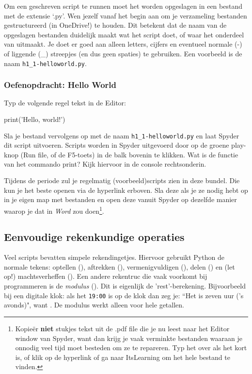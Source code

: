 \documentclass[a4paper,11pt, fleqn]{article}
\begin{document}
Om een geschreven script te runnen moet het worden opgeslagen in een bestand met de extensie `.py'. Wen jezelf vanaf het begin aan om je verzameling bestanden gestructureerd (in OneDrive!) te houden. Dit betekent dat de naam van de opgeslagen bestanden duidelijk maakt wat het script doet, of waar het onderdeel van uitmaakt. Je doet er goed aan alleen letters, cijfers en eventueel normale (-) of liggende (\_) streepjes (en dus geen spaties) te gebruiken. Een voorbeeld is de naam \verb,h1_1-helloworld.py,.

\subsubsection*{Oefenopdracht: Hello World} 
Typ de volgende regel tekst in de Editor: 
\begin{python}
print('Hello, world!')
\end{python}
Sla je bestand vervolgens op met de naam \verb,h1_1-helloworld.py, en laat Spyder dit script uitvoeren. 
Scripts worden in Spyder uitgevoerd door op de groene play-knop (Run file, of de F5-toets) in de balk bovenin te klikken.
Wat is de functie van het commando print? Kijk hiervoor in de console rechtsonderin.

Tijdens de periode zul je regelmatig (voorbeeld)scripts zien in deze bundel. Die kun je het beste openen via de hyperlink erboven. 
Sla deze als je ze nodig hebt op in je eigen map met bestanden en open deze vanuit Spyder op dezelfde manier waarop je dat in \textit{Word} zou doen\footnote{Kopie\"{e}r \textbf{niet} stukjes tekst uit de .pdf file die je nu leest naar het Editor window van Spyder, want dan krijg je vaak verminkte bestanden waaraan je onnodig veel tijd moet besteden om ze te repareren. Typ het over als het kort is, of klik op de hyperlink of ga naar ItsLearning om het hele bestand te vinden.}.

\subsection{Eenvoudige rekenkundige operaties}
Veel scripts bevatten simpele rekendingetjes. Hiervoor gebruikt Python de normale tekens: optellen (\pythoninline{+}), aftrekken (\pythoninline{-}), vermenigvuldigen (\pythoninline{*}), delen (\pythoninline{/}) en (let op!) machtsverheffen (\pythoninline{**}). Een andere rekentruc die vaak voorkomt bij programmeren is de \textit{modulus} (\pythoninline{\%}). Dit is eigenlijk de 'rest'-berekening. Bijvoorbeeld bij een digitale klok: als het \verb,19:00, is op de klok dan zeg je: ``Het is zeven uur ('s avonds)", want . De modulus werkt alleen voor hele getallen.
\end{document}
